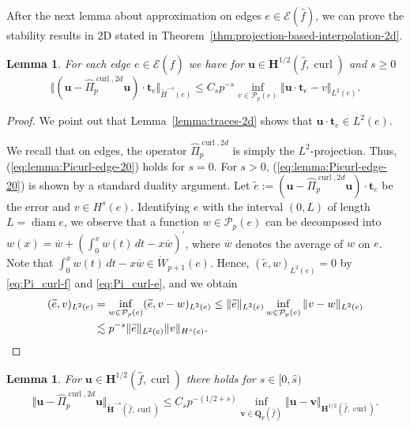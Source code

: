 \documentclass{article}
\newtheorem{lemma}[theorem]{Lemma}
\newcommand{\hatPicurlcomtwod}{\widehat \Pi^{\operatorname*{curl},2d}_p}
\begin{document}
After the next lemma about approximation on edges $e\in\mathcal{E}(\widehat{f})$, we can prove the stability results in 2D stated in Theorem~\ref{thm:projection-based-interpolation-2d}.

\begin{lemma}
\label{lemma:Picurl-edge} For each edge $e\in{\mathcal{E}}(\widehat{f})$ we
have for ${\mathbf{u}}\in{\mathbf{H}}^{1/2}(\widehat{f},\operatorname*{curl})$  and $s \ge 0$ 
\begin{equation}
\Vert({\mathbf{u}}-\hatPicurlcomtwod{\mathbf{u}%
})\cdot{\mathbf{t}}_{e}\Vert_{\widetilde{H}^{-s}(e)}\leq C_{s}  p^{-s}%
\inf_{v \in {\mathcal P}_p(e)} \Vert{\mathbf{u}}\cdot{\mathbf{t}}_{e} - v\Vert_{L^{2}(e)}. 
\label{eq:lemma:Picurl-edge-20}%
\end{equation}
\end{lemma}

\begin{proof}
We point out that Lemma~\ref{lemma:traces-2d} shows that ${\mathbf u} \cdot {\mathbf t}_e \in L^2(e)$. 

We recall that on edges, the operator $\hatPicurlcomtwod$ is simply the $L^{2}$-projection. Thus, (\ref{eq:lemma:Picurl-edge-20})
holds for $s=0$. For $s>0$, (\ref{eq:lemma:Picurl-edge-20}) is shown by a
standard duality argument. 
Let $\widetilde{e}:=\left(  {\mathbf{u}%
}-\hatPicurlcomtwod{\mathbf{u}}\right)
\cdot{\mathbf{t}}_{e}$ be the error and $v\in H^{s}(e)$. 
Identifying $e$ with the interval $(0,L)$ of length 
$L = \operatorname{diam} e$, we observe that  
a function $w\in \mathcal{P}_p(e)$ 
can be decomposed into $w(x)=\overline{w}+\left(\int_0^x w(t)\,dt-x \overline{w}\right)^\prime$, 
where $\overline{w}$ denotes the average of $w$ on $e$. Note that 
$\int_0^x w(t)\,dt - x \overline{w} \in \mathring W_{p+1}(e)$. 
Hence, $(\widetilde{e},w)_{L^2(e)} = 0$ 
by \eqref{eq:Pi_curl-f} and \eqref{eq:Pi_curl-e}, and we obtain
\begin{align*}
(\widetilde{e},v)_{L^{2}(e)}&=
\inf_{w\in \mathcal{P}_p(e)} (\widetilde{e},v-w)_{L^{2}(e)} 
\leq \Vert\widetilde{e}\Vert_{L^2(e)} 
 \inf_{w\in{\mathcal{P}}_{p}(e)} \Vert v-w\Vert _{L^{2}(e)} \\
& \lesssim p^{-s} \Vert\widetilde{e}\Vert_{L^{2}(e)} \Vert v\Vert_{H^{s}(e)}.
\qedhere
\end{align*}
\end{proof}

\begin{lemma}
\label{lemma:Picurl-face}
For ${\mathbf{u}}\in{\mathbf{H}}^{1/2}(\widehat{f},\operatorname*{curl})$ there holds 
for $s \in [0,\widehat{s})$
\[
\Vert{\mathbf{u}}-\hatPicurlcomtwod{\mathbf{u}}\Vert_{\widetilde{\mathbf{H}}^{-s}(\widehat{f},\operatorname{curl})}
\leq C_s  p^{-(1/2+s)}%
\inf_{{\mathbf v} \in {\mathbf Q}_p(\widehat f)} 
\Vert{\mathbf{u} - \mathbf{v} }\Vert_{\mathbf{H}^{1/2}(\widehat{f},\operatorname*{curl})}. 
\]

\end{lemma}
\end{document}

